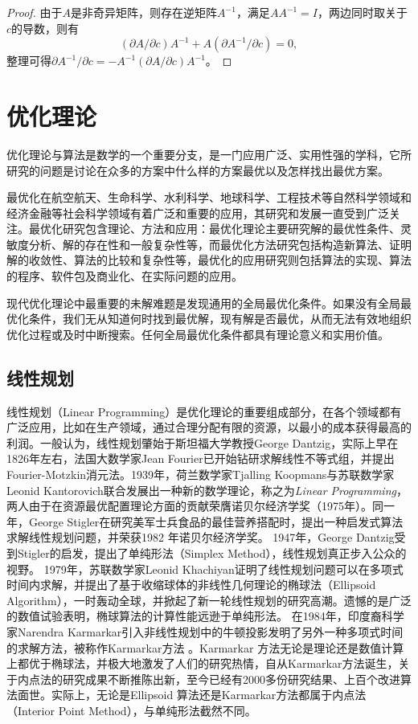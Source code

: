 \begin{proof}
由于$A$是非奇异矩阵，则存在逆矩阵$A^{-1}$，满足$AA^{-1}=I$，两边同时取关于$c$的导数，则有
\[
   (\partial A/\partial c) A^{-1} + A (\partial A^{-1}/\partial c) = 0,
\]
整理可得$\partial A^{-1}/\partial c = -A^{-1} (\partial A/\partial c) A^{-1}$。
\end{proof}


\chapter{优化理论}
优化理论与算法是数学的一个重要分支，是一门应用广泛、实用性强的学科，它所研究的问题是讨论在众多的方案中什么样的方案最优以及怎样找出最优方案。

最优化在航空航天、生命科学、水利科学、地球科学、工程技术等自然科学领域和经济金融等社会科学领域有着广泛和重要的应用，其研究和发展一直受到广泛关注。最优化研究包含理论、方法和应用：最优化理论主要研究解的最优性条件、灵敏度分析、解的存在性和一般复杂性等，而最优化方法研究包括构造新算法、证明解的收敛性、算法的比较和复杂性等，最优化的应用研究则包括算法的实现、算法的程序、软件包及商业化、在实际问题的应用。

现代优化理论中最重要的未解难题是发现通用的全局最优化条件。如果没有全局最优化条件，我们无从知道何时找到最优解，现有解是否最优，从而无法有效地组织优化过程或及时中断搜索。任何全局最优化条件都具有理论意义和实用价值。

\ornamento
\section{线性规划}
线性规划（Linear Programming）是优化理论的重要组成部分，在各个领域都有广泛应用，比如在生产领域，通过合理分配有限的资源，以最小的成本获得最高的利润。一般认为，线性规划肇始于斯坦福大学教授George Dantzig，实际上早在1826年左右，法国大数学家Jean Fourier已开始钻研求解线性不等式组，并提出Fourier-Motzkin消元法。1939年，荷兰数学家Tjalling Koopmans与苏联数学家Leonid Kantorovich联合发展出一种新的数学理论，称之为\textit{Linear Programming}，两人由于在资源最优配置理论方面的贡献荣膺诺贝尔经济学奖（1975年）。同一年，George Stigler\cite{stigler1945cost}在研究美军士兵食品的最佳营养搭配时，提出一种启发式算法求解线性规划问题，并荣获1982 年诺贝尔经济学奖。
1947年，George Dantzig受到Stigler的启发，提出了单纯形法（Simplex Method）\cite{dantzig1998linear}，线性规划真正步入公众的视野。
1979年，苏联数学家Leonid Khachiyan证明了线性规划问题可以在多项式时间内求解，并提出了基于收缩球体的非线性几何理论的椭球法（Ellipsoid Algorithm）\cite{khachiyan1979polynomial}，一时轰动全球，并掀起了新一轮线性规划的研究高潮。遗憾的是广泛的数值试验表明，椭球算法的计算性能远逊于单纯形法。
在1984年，印度裔科学家Narendra Karmarkar引入非线性规划中的牛顿投影发明了另外一种多项式时间的求解方法，被称作Karmarkar方法
\cite{karmarkar1984new}。Karmarkar 方法无论是理论还是数值计算上都优于椭球法，并极大地激发了人们的研究热情，自从Karmarkar方法诞生，关于内点法的研究成果不断推陈出新，至今已经有2000多份研究结果、上百个改进算法面世。实际上，无论是Ellipsoid 算法还是Karmarkar方法都属于内点法（Interior Point Method），与单纯形法截然不同。

